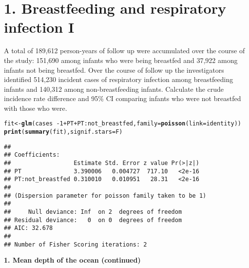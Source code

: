 \documentclass[10pt,handout]{beamer}\usepackage[]{graphicx}\usepackage[]{color}
\makeatletter
\newcommand{\hlnum}[1]{\textcolor[rgb]{0.686,0.059,0.569}{#1}}%
\newcommand{\hlopt}[1]{\textcolor[rgb]{0,0,0}{#1}}%
\newcommand{\hlstd}[1]{\textcolor[rgb]{0.345,0.345,0.345}{#1}}%
\newcommand{\hlkwb}[1]{\textcolor[rgb]{0.69,0.353,0.396}{#1}}%
\newcommand{\hlkwc}[1]{\textcolor[rgb]{0.333,0.667,0.333}{#1}}%
\newcommand{\hlkwd}[1]{\textcolor[rgb]{0.737,0.353,0.396}{\textbf{#1}}}%
\newenvironment{kframe}{%
 \def\at@end@of@kframe{}%
 \ifinner\ifhmode%
  \def\at@end@of@kframe{\end{minipage}}%
  \begin{minipage}{\columnwidth}%
 \fi\fi%
 \def\FrameCommand##1{\hskip\@totalleftmargin \hskip-\fboxsep
 \colorbox{shadecolor}{##1}\hskip-\fboxsep
     \hskip-\linewidth \hskip-\@totalleftmargin \hskip\columnwidth}%
 \MakeFramed {\advance\hsize-\width
   \@totalleftmargin\z@ \linewidth\hsize
   \@setminipage}}%
 {\par\unskip\endMakeFramed%
 \at@end@of@kframe}
\newenvironment{knitrout}{}{} %
\makeatother
\begin{document}
\section{1. Breastfeeding and respiratory infection I}
\begin{frame}
\vspace*{-.91in}
\tiny
A total of 189,612 person-years of follow up were accumulated over the course of the study: 151,690
among infants who were being breastfed and 37,922 among infants not being breastfed. Over the
course of follow up the investigators identified 514,230 incident cases of respiratory infection among
breastfeeding infants and 140,312 among non-breastfeeding infants. Calculate the crude incidence rate difference and 95\% CI comparing infants who were not breastfed with those who were.
\begin{knitrout}\tiny
{}\color{fgcolor}\begin{kframe}
\begin{alltt}
\hlstd{fit} \hlkwb{<-} \hlkwd{glm}\hlstd{(cases} \hlopt{~ -}\hlnum{1} \hlopt{+} \hlstd{PT} \hlopt{+} \hlstd{PT}\hlopt{:}\hlstd{not_breastfed,} \hlkwc{family} \hlstd{=} \hlkwd{poisson}\hlstd{(}\hlkwc{link} \hlstd{= identity))}
\hlkwd{print}\hlstd{(}\hlkwd{summary}\hlstd{(fit),} \hlkwc{signif.stars} \hlstd{= F)}
\end{alltt}
\begin{verbatim}
## 
## Coefficients:
##                  Estimate Std. Error z value Pr(>|z|)
## PT               3.390006   0.004727  717.10   <2e-16
## PT:not_breastfed 0.310010   0.010951   28.31   <2e-16
## 
## (Dispersion parameter for poisson family taken to be 1)
## 
##     Null deviance: Inf  on 2  degrees of freedom
## Residual deviance:   0  on 0  degrees of freedom
## AIC: 32.678
## 
## Number of Fisher Scoring iterations: 2
\end{verbatim}
\end{kframe}
\end{knitrout}

\end{frame}

\begin{frame}
	\vspace*{-5.0in}
	\textbf{1. Mean depth of the ocean (continued)}
	
\end{frame}
\end{document}
